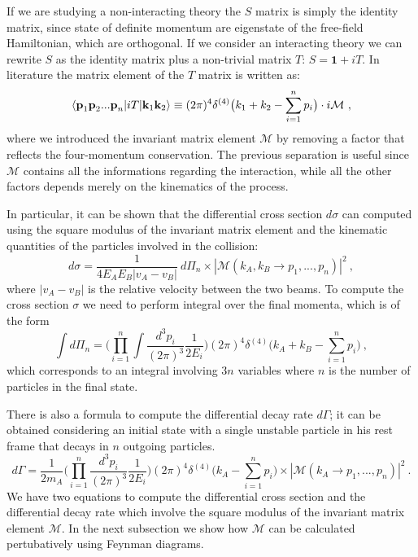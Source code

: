 \documentclass[../main/main.tex]{subfiles}
\begin{document}
If we are studying a non-interacting theory the $S$ matrix is simply the identity matrix, since state of
definite momentum are eigenstate of the free-field Hamiltonian, which are orthogonal. If we consider an interacting theory we can rewrite $S$ as the identity matrix plus a non-trivial matrix $T$: $S = \textbf{1}+ i T$.
\newline
In literature the matrix element of the $T$ matrix is written as:
\begin{equation}
	\label{first matrix element}
	\braket{\textbf{p}_1\textbf{p}_2 ... \textbf{p}_n |i T | \textbf{k}_1 \textbf{k}_2 } \equiv 
	(2 \pi)^4 \delta^{(4)}\big(k_1+k_2- \sum_{i=1}^n p_i\big) \cdot i \mathcal{M} \ ,
\end{equation}
where we introduced the invariant matrix element $\mathcal{M}$ by removing a factor that reflects the four-momentum conservation.
The previous separation is useful since $\mathcal{M}$ contains all the informations regarding the interaction, while all the other factors depends merely on the kinematics of the process.

In particular, it can be shown that the differential cross section $d\sigma$ can computed using the square modulus of the invariant 
matrix element and the kinematic quantities of the particles involved in the collision:
\begin{equation}
	\label{sigma}
	d \sigma = \frac{1}{4 E_A E_B |v_A - v_B|} \  d\Pi_n \times |\mathcal{M}(k_A, k_B \to p_1, ..., p_n)|^2  \ ,
\end{equation}
where $ |v_A - v_B|$ is the relative velocity between the two beams.  To compute the cross section $\sigma$ we need to perform integral over the final momenta, which is of the form
\begin{equation}
	\int d\Pi_n  = \bigg( \prod_{i=1}^{n}\int
	\frac{d^3 p_i}{(2 \pi)^3}
	\frac{1}{2 E_i} \bigg) (2\pi)^4 \delta^{(4)}\big(k_A+ k_B- \sum_{i=1}^n p_i\big) \ ,
\end{equation} 
which corresponds to an integral involving $3n$ variables where $n$ is the number of particles in the final state.

There is also a formula to compute the differential decay rate $d\Gamma$; it can be obtained considering an initial state with a single
unstable particle in his rest frame that decays in $n$ outgoing particles.
\begin{equation}
	d\Gamma = \frac{1}{2 m_A} \bigg( \prod_{i=1}^{n}
	\frac{d^3 p_i}{(2 \pi)^3}
	\frac{1}{2 E_i} \bigg) (2\pi)^4 \delta^{(4)}\big(k_A- \sum_{i=1}^n p_i\big) \times |\mathcal{M}(k_A \to p_1, ..., p_n)|^2 \ .
\end{equation}
We have two equations to compute the differential cross section and the differential decay rate which involve the square modulus of 
the invariant matrix element $\mathcal{M}$. In the next subsection we show how $\mathcal{M}$ can be calculated pertubatively using Feynman diagrams.
\end{document}
